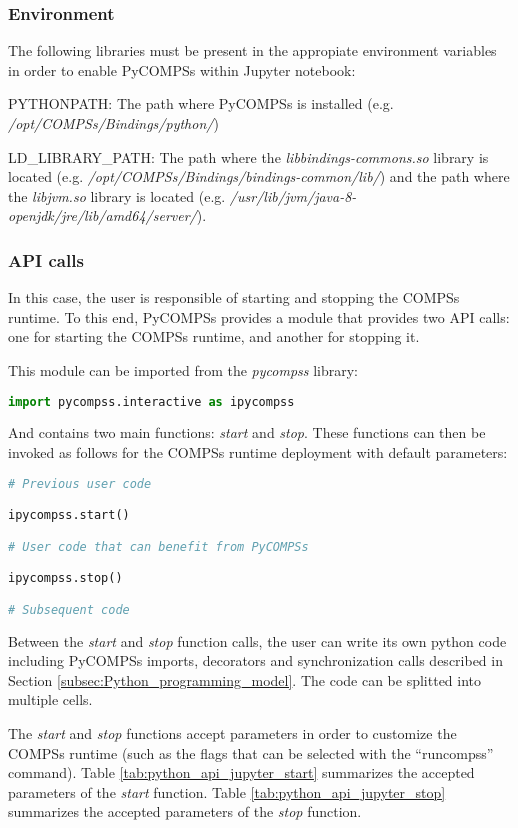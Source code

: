 \subsubsection{Environment}
The following libraries must be present in the appropiate environment variables in order to enable PyCOMPSs within Jupyter notebook:

PYTHONPATH: The path where PyCOMPSs is installed (e.g. \textit{/opt/COMPSs/Bindings/python/})

LD\_LIBRARY\_PATH: The path where the {\it libbindings-commons.so} library is located (e.g. \textit{/opt/COMPSs/Bindings/bindings-common/lib/}) and the path where the {\it libjvm.so} library is located (e.g. \textit{/usr/lib/jvm/java-8-openjdk/jre/lib/amd64/server/}).

\subsubsection{API calls}

In this case, the user is responsible of starting and stopping the COMPSs runtime.
To this end, PyCOMPSs provides a module that provides two API calls: one for starting the COMPSs runtime, and another for stopping it.

This module can be imported from the {\it pycompss} library:

\begin{lstlisting}[language=python]
import pycompss.interactive as ipycompss
\end{lstlisting}

And contains two main functions: {\it start} and {\it stop}. These functions can then be invoked as follows for the COMPSs runtime deployment with default parameters:

\begin{lstlisting}[language=python]
# Previous user code

ipycompss.start()

# User code that can benefit from PyCOMPSs

ipycompss.stop()

# Subsequent code
\end{lstlisting}

Between the {\it start} and {\it stop} function calls, the user can write its own python code including PyCOMPSs imports, decorators and synchronization calls described in Section \ref{subsec:Python_programming_model}.
The code can be splitted into multiple cells.

The {\it start} and {\it stop} functions accept parameters in order to customize the COMPSs runtime (such as the flags that can be selected with the ``runcompss'' command).
Table \ref{tab:python_api_jupyter_start} summarizes the accepted parameters of the {\it start} function.
Table \ref{tab:python_api_jupyter_stop} summarizes the accepted parameters of the {\it stop} function.


